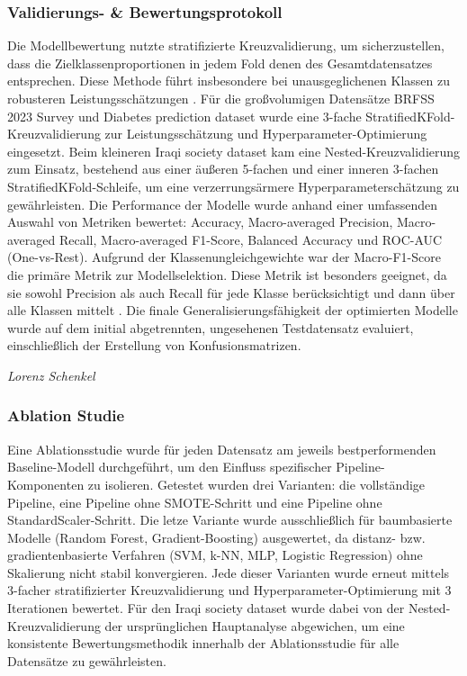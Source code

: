\documentclass[10pt]{scrartcl}
\begin{document}
\subsubsection{Validierungs- \& Bewertungsprotokoll}
Die Modellbewertung nutzte stratifizierte Kreuzvalidierung, um sicherzustellen, dass die Zielklassenproportionen in jedem Fold denen des Gesamtdatensatzes entsprechen. Diese Methode führt insbesondere bei unausgeglichenen Klassen zu robusteren Leistungsschätzungen \cite{sklearn_stratified_kfold}. Für die großvolumigen Datensätze BRFSS 2023 Survey und Diabetes prediction dataset wurde eine 3-fache StratifiedKFold-Kreuzvalidierung zur Leistungsschätzung und Hyperparameter-Optimierung eingesetzt. Beim kleineren Iraqi society dataset kam eine Nested-Kreuzvalidierung zum Einsatz, bestehend aus einer äußeren 5-fachen und einer inneren 3-fachen StratifiedKFold-Schleife, um eine verzerrungsärmere Hyperparameterschätzung zu gewährleisten. Die Performance der Modelle wurde anhand einer umfassenden Auswahl von Metriken bewertet: Accuracy, Macro-averaged Precision, Macro-averaged Recall, Macro-averaged F1-Score, Balanced Accuracy und ROC-AUC (One-vs-Rest). Aufgrund der Klassenungleichgewichte war der Macro-F1-Score die primäre Metrik zur Modellselektion. Diese Metrik ist besonders geeignet, da sie sowohl Precision als auch Recall für jede Klasse berücksichtigt und dann über alle Klassen mittelt \cite{sklearn_f1_score}. Die finale Generalisierungsfähigkeit der optimierten Modelle wurde auf dem initial abgetrennten, ungesehenen Testdatensatz evaluiert, einschließlich der Erstellung von Konfusionsmatrizen.

\begin{flushright}
  \footnotesize\textit{Lorenz Schenkel}
\end{flushright}




\subsubsection{Ablation Studie}
Eine Ablationsstudie wurde für jeden Datensatz am jeweils bestperformenden Baseline-Modell durchgeführt, um den Einfluss spezifischer Pipeline-Komponenten zu isolieren. Getestet wurden drei Varianten: die vollständige Pipeline, eine Pipeline ohne SMOTE-Schritt und eine Pipeline ohne StandardScaler-Schritt. Die letze Variante wurde ausschließlich für baumbasierte Modelle (Random Forest, Gradient-Boosting) ausgewertet, da distanz- bzw. gradientenbasierte Verfahren (SVM, k-NN, MLP, Logistic Regression) ohne Skalierung nicht stabil konvergieren. Jede dieser Varianten wurde erneut mittels 3-facher stratifizierter Kreuzvalidierung und Hyperparameter-Optimierung mit 3 Iterationen bewertet. Für den Iraqi society dataset wurde dabei von der Nested-Kreuzvalidierung der ursprünglichen Hauptanalyse abgewichen, um eine konsistente Bewertungsmethodik innerhalb der Ablationsstudie für alle Datensätze zu gewährleisten.
\end{document}
